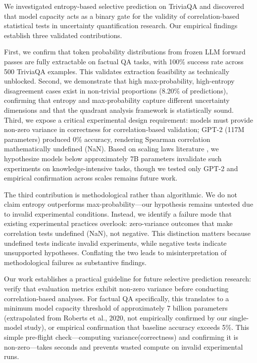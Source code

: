 
We investigated entropy-based selective prediction on TriviaQA and discovered that model capacity acts as a binary gate for the validity of correlation-based statistical tests in uncertainty quantification research. Our empirical findings establish three validated contributions.

First, we confirm that token probability distributions from frozen LLM forward passes are fully extractable on factual QA tasks, with 100\% success rate across 500 TriviaQA examples. This validates extraction feasibility as technically unblocked. Second, we demonstrate that high max-probability, high-entropy disagreement cases exist in non-trivial proportions (8.20\% of predictions), confirming that entropy and max-probability capture different uncertainty dimensions and that the quadrant analysis framework is statistically sound. Third, we expose a critical experimental design requirement: models must provide non-zero variance in correctness for correlation-based validation; GPT-2 (117M parameters) produced 0\% accuracy, rendering Spearman correlation mathematically undefined (NaN). Based on scaling laws literature \citep{Roberts2020}, we hypothesize models below approximately 7B parameters invalidate such experiments on knowledge-intensive tasks, though we tested only GPT-2 and empirical confirmation across scales remains future work.

The third contribution is methodological rather than algorithmic. We do not claim entropy outperforms max-probability---our hypothesis remains untested due to invalid experimental conditions. Instead, we identify a failure mode that existing experimental practices overlook: zero-variance outcomes that make correlation tests undefined (NaN), not negative. This distinction matters because undefined tests indicate invalid experiments, while negative tests indicate unsupported hypotheses. Conflating the two leads to misinterpretation of methodological failures as substantive findings.

Our work establishes a practical guideline for future selective prediction research: verify that evaluation metrics exhibit non-zero variance before conducting correlation-based analyses. For factual QA specifically, this translates to a minimum model capacity threshold of approximately 7 billion parameters (extrapolated from Roberts et al., 2020, not empirically confirmed by our single-model study), or empirical confirmation that baseline accuracy exceeds 5\%. This simple pre-flight check---computing variance(correctness) and confirming it is non-zero---takes seconds and prevents wasted compute on invalid experimental runs.

